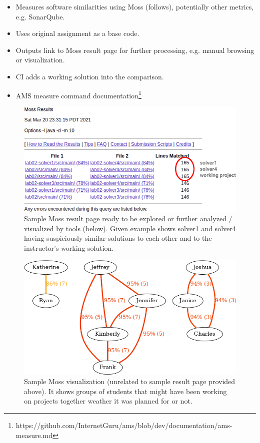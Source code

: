 \begin{itemize}
\item
  {Measures software similarities using Moss (follows), potentially other metrics, e.g. SonarQube.}
\item
  {Uses original assignment as a base code.}
\item
  {Outputs link to Moss result page for further processing, e.g. manual browsing or visualization.}
\item
  {CI adds a working solution into the comparison.}
\item
  {AMS measure command documentation\footnote{https://github.com/InternetGuru/ams/blob/dev/documentation/ams-measure.md}}
\end{itemize}

\begin{figure}[H]
    \centering
    \includegraphics[width=\textwidth,height=\textheight,keepaspectratio]{Figures/impl/image3.png}
    \caption[Moss result page example]{Sample Moss result page ready to be explored or further analyzed / visualized by tools (below). Given example shows solver1 and solver4 having suspiciously similar solutions to each other and to the instructor's working solution.}
\end{figure}

\begin{figure}[H]
    \centering
    \includegraphics[width=\textwidth,height=\textheight,keepaspectratio]{Figures/impl/image6.png}
    \caption[Moss visualization example]{Sample Moss visualization (unrelated to sample result page provided above). It shows groups of students that might have been working on projects together weather it was planned for or not.}
\end{figure}

